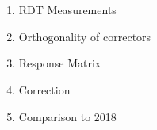 \chapter{}
\label{chapter:skew_octupole_fields}
\thumbforchapter{}

\section{}

\begin{enumerate}
    \color{red}
    \item RDT Measurements
    \item Orthogonality of correctors
    \item Response Matrix
    \item Correction
    \item Comparison to 2018
\end{enumerate}


%
%





\section{}